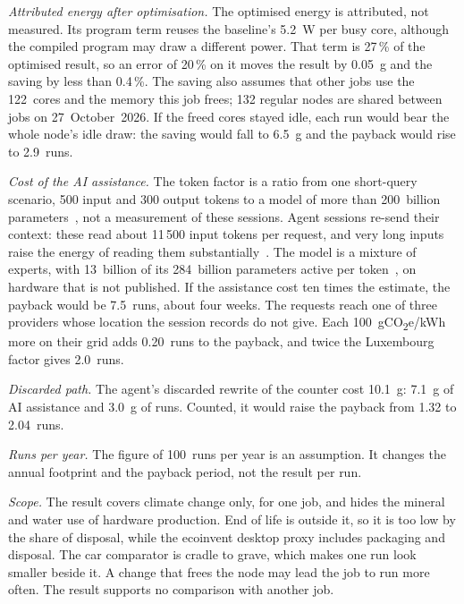 \documentclass[conference,a4paper]{IEEEtran}
\begin{document}
\emph{Attributed energy after optimisation.} The optimised energy is
attributed, not measured. Its program term reuses the baseline's 5.2~W per busy
core, although the compiled program may draw a different power. That term is
27\,\% of the optimised result, so an error of 20\,\% on it moves the result by
0.05~g and the saving by less than 0.4\,\%. The saving also assumes that other
jobs use the 122~cores and the memory this job frees; 132 regular nodes are
shared between jobs on 27~October~2026. If the freed cores stayed idle, each run
would bear the whole node's idle draw: the saving would fall to 6.5~g and the
payback would rise to 2.9~runs.

\emph{Cost of the AI assistance.} The token factor is a ratio from one
short-query scenario, 500 input and 300 output tokens to a model of more than
200~billion parameters~\cite{oviedo2026}, not a measurement of these sessions.
Agent sessions re-send their context: these read about 11\,500 input tokens per
request, and very long inputs raise the energy of reading them
substantially~\cite{oviedo2026}. The model is a mixture of experts, with
13~billion of its 284~billion parameters active per token~\cite{openrouterdsv4},
on hardware that is not published. If the assistance cost ten times the
estimate, the payback would be 7.5~runs, about four weeks. The requests reach
one of three providers whose location the session records do not give. Each
100~gCO\textsubscript{2}e/kWh more on their grid adds 0.20~runs to the payback,
and twice the Luxembourg factor gives 2.0~runs.

\emph{Discarded path.} The agent's discarded rewrite of the counter cost
10.1~g: 7.1~g of AI assistance and 3.0~g of runs. Counted, it would raise the
payback from 1.32 to 2.04~runs.

\emph{Runs per year.} The figure of 100~runs per year is an assumption. It
changes the annual footprint and the payback period, not the result per run.

\emph{Scope.} The result covers climate change only, for one job, and hides the
mineral and water use of hardware production. End of life is outside it, so it
is too low by the share of disposal, while the ecoinvent desktop proxy includes
packaging and disposal. The car comparator is cradle to grave, which makes one
run look smaller beside it. A change that frees the node may lead the job to run
more often. The result supports no comparison with another job.

\end{document}
